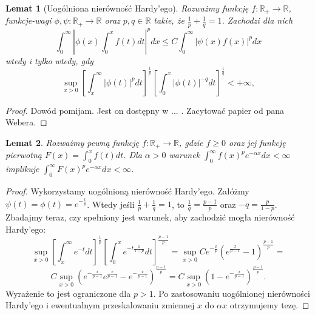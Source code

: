 \documentclass[licencjacka]{pracamgr}
\theoremstyle{definition}
\theoremstyle{definition}
\theoremstyle{plain}
\newtheorem{lemma}{Lemat}[section]
\theoremstyle{plain}
\begin{document}
\begin{lemma}[Uogólniona nierówność Hardy'ego]
    Rozważmy funkcję $f: \mathbb{R}_{+} \rightarrow \mathbb{R}$, funkcje-wagi
    $\phi, \psi: \mathbb{R}_{+} \rightarrow \mathbb{R}$ oraz $p, q \in
    \mathbb{R}$ takie, że $\frac{1}{p} + \frac{1}{q} = 1 $.  Zachodzi dla nich
$$
\int_0^\infty \left|
                \phi(x) \int_0^x f(t) dt
              \right|^p dx
\leq
C \int_0^\infty \left|
                    \psi(x)  f(x)
                \right|^p dx
$$
wtedy i tylko wtedy, gdy
$$
\sup_{x > 0}
\left[
\int_x^\infty  
   | \phi(t) |^p dt
\right]^{\frac{1}{p}}
\left[
\int_0^x
    | \phi(t) |^{-q} dt
\right]^{\frac{1}{q}} < + \infty,
$$
\end{lemma}
\begin{proof}
    Dowód pomijam. 
    Jest on dostępny w ... . Zacytować papier od pana Webera.
\end{proof}

\begin{lemma}
Rozważmy pewną funkcję $f: \mathbb{R}_{+} \rightarrow \mathbb{R}$, gdzie $f
\geq 0$ oraz jej funkcję pierwotną $F(x) = \int_0^{x} f(t) dt$. Dla $\alpha > 0$ warunek
$\int_0^\infty f(x)^p e^{-\alpha x}dx < \infty$ implikuje $\int_0^\infty
F(x)^pe^{- \alpha x}dx < \infty$.  \\
\end{lemma}
\begin{proof}
Wykorzystamy uogólnioną nierówność Hardy'ego.  Załóżmy $\psi(t) = \phi(t) =
e^{- \frac{t}{p} }$. Wtedy jeśli $\frac{1}{p} + \frac{1}{q} = 1 $, to
$\frac{1}{q} = \frac{p-1}{p}$ oraz $-q = \frac{p}{1-p}$.  Zbadajmy teraz, czy
spełniony jest warunek, aby zachodzić mogła nierówność Hardy'ego:
$$
\sup_{x > 0}
\left[
\int_x^\infty  
    e^{-t} dt
\right]^{\frac{1}{p}}
\left[
\int_0^x
    e^{-t \frac{1}{1-p}} dt
\right]^{\frac{p-1}{p}}
=
\sup_{x > 0}
    C
    e^{- \frac{x}{p}}
    \left(
        e^{\frac{x}{p-1}} - 1
    \right)^{\frac{p-1}{p}}
=
$$
$$
C
\sup_{x > 0}
    \left(
    e^{- \frac{x}{p-1}}
        e^{\frac{x}{p-1}} -
    e^{- \frac{x}{p-1}}
    \right)^{\frac{p-1}{p}}
=
C
\sup_{x > 0}
    \left(
        1 -
    e^{- \frac{x}{p-1}}
    \right)^{\frac{p-1}{p}}. 
$$
Wyrażenie to jest ograniczone dla $p> 1$. Po zastosowaniu uogólnionej
nierówności Hardy'ego i ewentualnym przeskalowaniu zmiennej $x$ do $\alpha x$
otrzymujemy tezę.
\end{proof}
\end{document}
